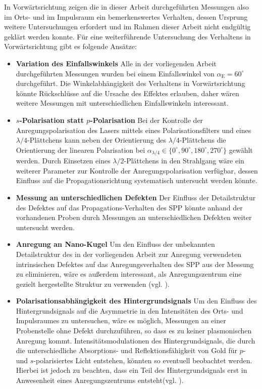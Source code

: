 \documentclass[a4paper, titlepage,  ngerman]{book}
\begin{document}
		
	In Vorwärtsrichtung zeigen die in dieser Arbeit durchgeführten Messungen also im Orts- und im Impulsraum ein bemerkenswertes Verhalten, dessen Ursprung weitere Untersuchungen erfordert und im Rahmen dieser Arbeit nicht endgültig geklärt werden konnte. Für eine weiterführende Untersuchung des Verhaltens in Vorwärtsrichtung gibt es folgende Ansätze:
	\begin{itemize}
		\item \textbf{Variation des Einfallswinkels} Alle in der vorliegenden Arbeit durchgeführten Messungen wurden bei einem Einfallswinkel von $\alpha_{\mathrm{E}} = 60^\circ$ durchgeführt. Die Winkelabhängigkeit des Verhaltens in Vorwärtsrichtung könnte Rückschlüsse auf die Ursache des Effektes erlauben, daher wären weitere Messungen mit unterschiedlichen Einfallswinkeln interessant.
		\item \textbf{$s$-Polarisation statt $p$-Polarisation} Bei der Kontrolle der Anregungspolarisation des Lasers mittels eines Polarisationsfilters und eines $\lambda / 4$-Plättchens kann neben der Orientierung  des $\lambda / 4$-Plättchens die Orientierung der linearen Polarisation bei $\alpha_{\lambda /4} \in \{0^\circ, 90^\circ, 180^\circ, 270^\circ\}$ gewählt werden. Durch Einsetzen eines $\lambda /2$-Plättchens in den Strahlgang wäre ein weiterer Parameter zur Kontrolle der Anregungspolarisation verfügbar, dessen Einfluss auf die Propagationsrichtung systematisch untersucht werden könnte.
		\item \textbf{Messung an unterschiedlichen Defekten} Der Einfluss der Detailstruktur des Defektes auf das Propagations-Verhalten des SPP könnte anhand der vorhandenen Proben durch Messungen an unterschiedlichen Defekten weiter untersucht werden.
		\item \textbf{Anregung an Nano-Kugel} Um den Einfluss der unbekannten Detailstruktur des in der vorliegenden Arbeit zur Anregung verwendeten intrinsischen Defektes auf das Anregungsverhalten des SPP aus der Messung zu eliminieren, wäre es außerdem interessant, als Anregungszentrum eine gezielt hergestellte Struktur zu verwenden (vgl. \cite{OConnor.2014}). 
		\item \textbf{Polarisationsabhängigkeit des Hintergrundsignals} Um den Einfluss des Hintergrundsignals auf die Asymmetrie in den Intensitäten des Orts- und Impulsraumes zu untersuchen, wäre es möglich, Messungen an einer Probenstelle ohne Defekt durchzuführen, so dass es zu keiner plasmonischen Anregung kommt. Intensitätsmodulationen des Hintergrundsignals, die durch die unterschiedliche Absorptions- und Reflektionsfähigkeit von Gold für $p$- und $s$-polarisiertes Licht entstehen, könnten so eventuell beobachtet werden. Hierbei ist jedoch zu beachten, dass ein Teil des Hintergrundsignals erst in Anwesenheit eines Anregungszentrums entsteht(vgl. \cite{Drezet.2008}).
	\end{itemize}
	\appendix
		
	\newpage
\end{document}
